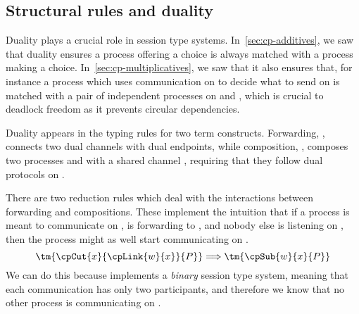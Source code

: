 \documentclass[UKenglish]{llncs}
\begin{document}
\subsection{Structural rules and duality}
\label{sec:cp-duality}
Duality plays a crucial role in session type systems.
In~\cref{sec:cp-additives}, we saw that duality ensures a process offering a choice
is always matched with a process making a choice.
In~\cref{sec:cp-multiplicatives}, we saw that it also ensures that, for instance
a process which uses communication on  to decide what to send on  is
matched with a pair of independent processes on  and , which is
crucial to deadlock freedom as it prevents circular dependencies.  

Duality appears in the typing rules for two \cp term constructs.
Forwarding, , connects two dual channels with dual endpoints,
while composition, , composes two processes  and
 with a shared channel , requiring that they follow dual protocols
on .
\begin{center}
  \cpInfAx
  \cpInfCut
\end{center}
There are two reduction rules which deal with the interactions between
forwarding and compositions. These implement the intuition that if a process is
meant to communicate on ,  is forwarding to , and nobody else
is listening on , then the process might as well start communicating on
.
\[
  \tm{\cpCut{x}{\cpLink{w}{x}}{P}} \Longrightarrow \tm{\cpSub{w}{x}{P}} 
\]
We can do this because \cp implements a \emph{binary} session type system,
meaning that each communication has only two participants, and therefore we know
that no other process is communicating on .
\end{document}
